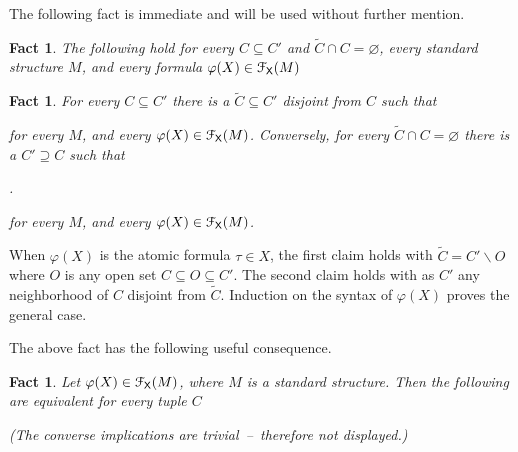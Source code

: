 \documentclass{amsproc}
\makeatletter
\newcounter{thm}
\theoremstyle{mio}
\newtheorem{fact}[thm]{Fact}\tcolorboxenvironment{fact}{mythm}
\providecommand{\proofNameStyle}{\bfseries}
\renewenvironment{proof}[1][\proofname]{\par
  \pushQED{\qed}%
  \normalfont%
  \trivlist
  \item[\hskip\labelsep
        \proofNameStyle
    #1\@addpunct{.}]\ignorespaces
}{%
  \popQED\endtrivlist\@endpefalse
}
\makeatother
\begin{document}
The following fact is immediate and will be used without further mention.

\begin{fact}\label{fact_trivial}
  The following hold for every $C\subseteq C'$ and $\tilde C\cap C=\varnothing$, every standard structure $M$, and every formula $\varphi(X)\in{\EuScript F}_{\sf X}(M)$

  \smallskip

  \smallskip
  
\end{fact}

\begin{fact}
  For every $C\subseteq C'$ there is a $\tilde C\subseteq C'$ disjoint from $C$ such that\smallskip
  
  \smallskip

  for every $M$, and every $\varphi(X)\in{\EuScript F}_{\sf X}(M)$.
  Conversely, for every $\tilde C\cap C=\varnothing$ there is a $C'\supseteq C$ such that

  .\smallskip

  for every $M$, and every $\varphi(X)\in{\EuScript F}_{\sf X}(M)$.
\end{fact}

\begin{proof}
  When $\varphi(X)$ is the atomic formula $\tau\in X$, the first claim holds with $\tilde C=C'\smallsetminus O$ where $O$ is any open set $C\subseteq O\subseteq C'$.
  The second claim holds with as $C'$ any neighborhood of $C$ disjoint from $\tilde C$.
  Induction on the syntax of $\varphi(X)$ proves the general case.
\end{proof}

The above fact has the following useful consequence.

\begin{fact}\label{fact_otto}
  Let $\varphi(X)\in{\EuScript F}_{\sf X}(M)$, where $M$ is a standard structure.
  Then the following are equivalent for every tuple $C$\smallskip
  
    \smallskip

    \smallskip

  (The converse implications are trivial~--~therefore not displayed.)
\end{fact}
\end{document}
